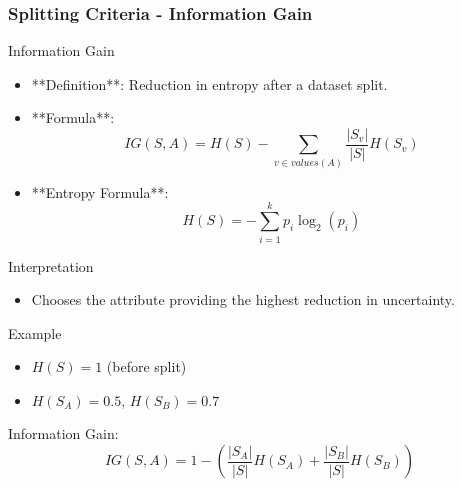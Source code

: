 \documentclass[aspectratio=169]{beamer}
\begin{document}
\begin{frame}[fragile]
  \frametitle{Splitting Criteria - Information Gain}
  \begin{block}{Information Gain}
    \begin{itemize}
      \item **Definition**: Reduction in entropy after a dataset split.
      \item **Formula**:
      \begin{equation}
      IG(S, A) = H(S) - \sum_{v \in values(A)} \frac{|S_v|}{|S|} H(S_v)
      \end{equation}
      \item **Entropy Formula**:
      \begin{equation}
      H(S) = -\sum_{i=1}^{k} p_i \log_2(p_i)
      \end{equation}
    \end{itemize}

    \begin{block}{Interpretation}
      \begin{itemize}
        \item Chooses the attribute providing the highest reduction in uncertainty.
      \end{itemize}
    \end{block}

    \begin{block}{Example}
    \begin{itemize}
      \item \( H(S) = 1 \) (before split)
      \item \( H(S_A) = 0.5 \), \( H(S_B) = 0.7 \)
    \end{itemize}
    Information Gain:
    \begin{equation}
      IG(S, A) = 1 - \left( \frac{|S_A|}{|S|} H(S_A) + \frac{|S_B|}{|S|} H(S_B) \right)
    \end{equation}
    \end{block}
  \end{block}
\end{frame}
\end{document}
